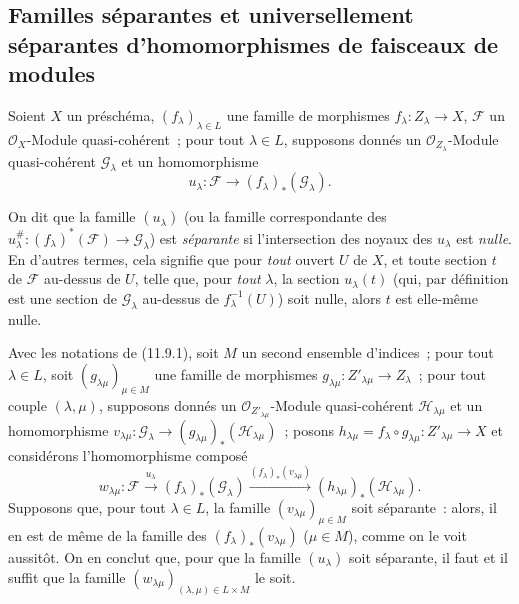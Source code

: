 \subsection{Familles séparantes et universellement séparantes d'homomorphismes
de faisceaux de modules}
\label{subsection:IV.11.9-fr}

\begin{env}[11.9.1]
\label{IV.11.9.1-fr}
Soient $X$ un préschéma, $(f_{\lambda})_{\lambda\in L}$ une famille de morphismes
$f_{\lambda}:Z_{\lambda}\to X$, $\mathcal F$ un $\mathcal O_X$-Module
quasi-cohérent~; pour tout $\lambda\in L$, supposons donnés un
$\mathcal O_{Z_{\lambda}}$-Module quasi-cohérent $\mathcal G_{\lambda}$ et un
homomorphisme
\begin{equation}
u_{\lambda}:\mathcal F\longrightarrow(f_{\lambda})_*(\mathcal G_{\lambda}).
\label{IV.11.9.1.1-fr}
\tag{11.9.1.1}
\end{equation}
\end{env}


On dit que la famille $(u_\lambda)$ (ou la famille correspondante des
$u^\#_\lambda:(f_\lambda)^*(\mathcal F)\to\mathcal G_\lambda$) est
\emph{séparante} si l'intersection des noyaux des $u_\lambda$ est
\emph{nulle}. En d'autres termes, cela signifie que pour \emph{tout} ouvert
$U$ de $X$, et toute section $t$ de $\mathcal F$ au-dessus de $U$, telle que,
pour \emph{tout} $\lambda$, la section $u_\lambda(t)$ (qui, par définition est
une section de $\mathcal G_\lambda$ au-dessus de $f_\lambda^{-1}(U)$) soit
nulle, alors $t$ est elle-même nulle.

\begin{env}[11.9.2]
\label{IV.11.9.2-fr}
Avec les notations de (11.9.1), soit $M$ un second ensemble d'indices~; pour
tout $\lambda\in L$, soit $(g_{\lambda\mu})_{\mu\in M}$ une famille de
morphismes $g_{\lambda\mu}:Z'_{\lambda\mu}\to Z_\lambda$~; pour tout couple
$(\lambda,\mu)$, supposons donnés un $\mathcal O_{Z'_{\lambda\mu}}$-Module
quasi-cohérent $\mathcal H_{\lambda\mu}$ et un homomorphisme
$v_{\lambda\mu}:\mathcal G_\lambda\to
(g_{\lambda\mu})_*(\mathcal H_{\lambda\mu})$~; posons
$h_{\lambda\mu}=f_\lambda\circ g_{\lambda\mu}:Z'_{\lambda\mu}\to X$ et
considérons l'homomorphisme composé
\[
w_{\lambda\mu}:\mathcal F\xrightarrow{u_\lambda}
(f_\lambda)_*(\mathcal G_\lambda)
\xrightarrow{(f_\lambda)_*(v_{\lambda\mu})}
(h_{\lambda\mu})_*(\mathcal H_{\lambda\mu}).
\]
Supposons que, pour tout $\lambda\in L$, la famille
$(v_{\lambda\mu})_{\mu\in M}$ soit séparante~: alors, il en est de même de la
famille des $(f_\lambda)_*(v_{\lambda\mu})$ ($\mu\in M$), comme on le voit
aussitôt. On en conclut que, pour que la famille $(u_\lambda)$ soit séparante,
il faut et il suffit que la famille
$(w_{\lambda\mu})_{(\lambda,\mu)\in L\times M}$ le soit.
\end{env}

